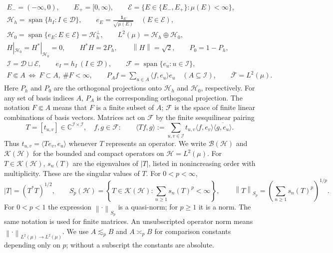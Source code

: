 \documentclass[11pt]{amsart}
\newcommand{\D}{\mathcal D}
\newcommand{\ip}[2]{\langle #1,#2\rangle}
\newcommand{\norm}[1]{\left\|#1\right\|}
\newcommand{\fin}{\Subset}
\begin{document}
\begin{gather*}
 E_- =(-\infty,0),\qquad E_+=[0,\infty),\qquad
 \mathscr E=\{E\in\{E_-,E_+\}:\mu(E)<\infty\},\\
 \mathcal H_h=\overline{\operatorname{span}}\{h_I:I\in\D\},\qquad
 e_E=\frac{\mathbf1_E}{\sqrt{\mu(E)}}\quad(E\in\mathscr E),\\
 \mathcal H_0=\operatorname{span}\{e_E:E\in\mathscr E\}
             =\mathcal H_h^\perp,\qquad
 L^2(\mu)=\mathcal H_h\oplus\mathcal H_0,\\
 H|_{\mathcal H_0}=H^*|_{\mathcal H_0}=0,\qquad
 H^*H=2P_h,\qquad \norm H=\sqrt2,\qquad P_0=1-P_h,\\
 \mathcal I=\D\sqcup\mathscr E,\qquad
 e_I=h_I\ (I\in\D),\qquad
 \mathscr F=\operatorname{span}\{e_u:u\in\mathcal I\},\\
 F\fin A\ \Longleftrightarrow\ F\subset A,\ \#F<\infty,\qquad
 P_Af=\sum_{u\in A}\ip{f}{e_u}e_u\quad(A\subseteq\mathcal I),\qquad
 \overline{\mathscr F}=L^2(\mu).
\end{gather*}
Here $P_h$ and $P_0$ are the orthogonal projections onto $\mathcal H_h$
and $\mathcal H_0$, respectively. For any set of basis indices $A$,
$P_A$ is the corresponding orthogonal projection. The notation
$F\fin A$ means that $F$ is a finite subset of $A$; $\mathscr F$ is
the space of finite linear combinations of basis vectors. Matrices
act on $\mathscr F$ by the finite sesquilinear pairing
\[
 T=[t_{u,v}]\in\mathbb C^{\mathcal I\times\mathcal I},\quad f,g\in\mathscr F:
 \qquad
 \ip{Tf}{g}:=\sum_{u,v\in\mathcal I}
       t_{u,v}\ip{f}{e_v}\overline{\ip{g}{e_u}}.
\]
Thus $t_{u,v}=\ip{Te_v}{e_u}$ whenever $T$ represents an operator.
We write $\mathcal B(\mathcal H)$ and $\mathcal K(\mathcal H)$ for
the bounded and compact operators on $\mathcal H=L^2(\mu)$.
For $T\in\mathcal K(\mathcal H)$, $s_n(T)$ are the eigenvalues of
$|T|$, listed in nonincreasing order with multiplicity. These are
the singular values of $T$. For $0<p<\infty$,
\[
 |T|=(T^*T)^{1/2},\qquad
 S_p(\mathcal H)=\left\{T\in\mathcal K(\mathcal H):
                      \sum_{n\ge1}s_n(T)^p<\infty\right\},\qquad
 \norm{T}_{S_p}=\left(\sum_{n\ge1}s_n(T)^p\right)^{1/p}.
\]
For $0<p<1$ the expression $\norm{\cdot}_{S_p}$ is a quasi-norm;
for $p\ge1$ it is a norm. The same notation is used for finite matrices.
An unsubscripted operator norm means
$\norm{\cdot}_{L^2(\mu)\to L^2(\mu)}$.
We use $A\lesssim_p B$ and $A\asymp_p B$ for comparison constants
depending only on $p$; without a subscript the constants are absolute.
\end{document}
